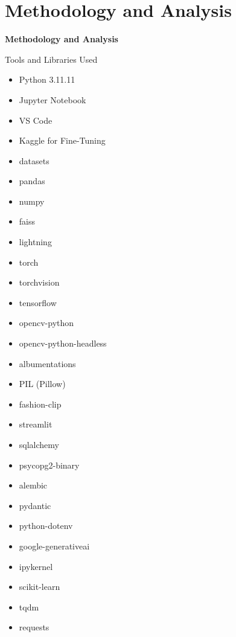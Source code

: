 \section{Methodology and Analysis}
\begin{frame}{}
  \Huge
  \centering
  \textbf{Methodology and Analysis}
  \normalsize
\end{frame}

\begin{frame}{Tools and Libraries Used}
  \small
  \begin{multicols}{3}
  \begin{itemize}
  \setlength\itemsep{-0.5em}
  \item Python 3.11.11
  \item Jupyter Notebook
  \item VS Code
  \item Kaggle for Fine-Tuning
  \item datasets
  \item pandas
  \item numpy
  \item faiss
  \item lightning
  \item torch
  \item torchvision
  \item tensorflow
  \item opencv-python
  \item opencv-python-headless
  \item albumentations
  \item PIL (Pillow)
  \item fashion-clip
  \item streamlit
  \item sqlalchemy
  \item psycopg2-binary
  \item alembic
  \item pydantic
  \item python-dotenv
  \item google-generativeai
  \item ipykernel
  \item scikit-learn
  \item tqdm
  \item requests
  \end{itemize}
  \end{multicols}
  \end{frame}


